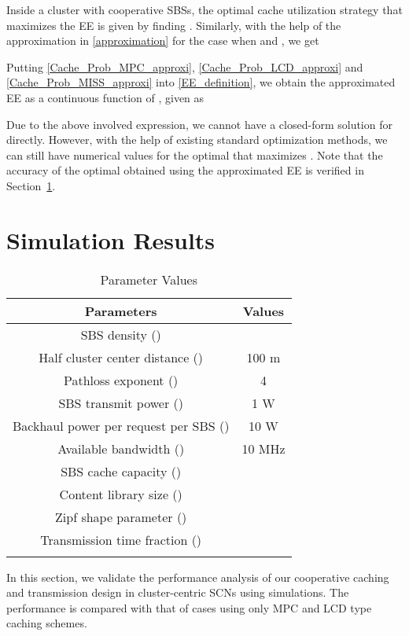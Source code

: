 \documentclass[twocolumns,10pt]{IEEEtran}
\begin{document}
Inside a cluster with  cooperative SBSs, the optimal cache utilization strategy that maximizes the EE is given by finding .
Similarly, with the help of the approximation in \eqref{approximation} for the case when  and , we get

Putting \eqref{Cache_Prob_MPC_approxi}, \eqref{Cache_Prob_LCD_approxi} and \eqref{Cache_Prob_MISS_approxi} into \eqref{EE_definition}, we obtain the approximated EE  as a continuous function of , given as


Due to the above involved expression, we cannot have a closed-form solution for  directly. However, with the help of existing standard optimization methods, we can still have numerical values for the optimal  that maximizes  . Note that the accuracy of the optimal  obtained using the approximated EE is verified in Section~\ref{sec:simulation}. 




\section{Simulation Results}\label{sec:simulation}
\label{simulation}

\begin{table}[t]
	\centering
	\caption{Parameter Values}
	\renewcommand{\arraystretch}{1.3}
	\begin{tabular}{c|c}
		\firsthline
		\textbf{Parameters}              & \textbf{Values}  \\
		\hline   
		SBS density () &       \\
		Half cluster center distance ()     & 100 m\\
		Pathloss exponent ()     & 4     \\  
		SBS transmit power () & 1 W      \\
		Backhaul power per request per SBS ()          & 10 W    \\
		Available bandwidth ()          & 10 MHz    \\
		SBS cache capacity ()          &      \\
		Content library size ()          &    \\
		Zipf shape parameter ()     &   \\
		Transmission time fraction ()     &   \\
		\lasthline
	\end{tabular}
\label{system_params}
\end{table}

In this section, we validate the performance analysis of our cooperative caching and transmission design in cluster-centric SCNs using simulations. The performance is compared with that of cases using only MPC and LCD type caching schemes.
\end{document}
